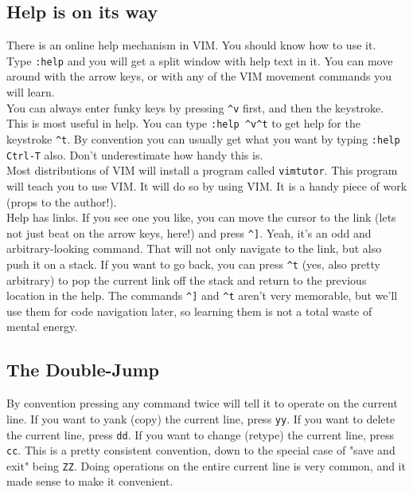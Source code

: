 \documentclass[a4paper, 12pt]{article}
\begin{document}
\subsection{Help is on its way}
\label{"Help is on its way"}
There is an online help mechanism in VIM. You should know how to use it.\\
Type \texttt{:help} and you will get a split window with help text in it. You can move around with the arrow keys, or with any of the VIM movement commands you will learn.\\
You can always enter funky keys by pressing \texttt{\^{}v} first, and then the keystroke. This is most useful in help. You can type \texttt{:help \^{}v\^{}t} to get help for the keystroke \texttt{\^{}t}. By convention you can usually get what you want by typing \texttt{:help Ctrl-T} also. Don't underestimate how handy this is.\\
Most distributions of VIM will install a program called \texttt{vimtutor}. This program will teach you to use VIM. It will do so by using VIM. It is a handy piece of work (props to the author!).\\
Help has links. If you see one you like, you can move the cursor to the link (lets not just beat on the arrow keys, here!) and press {\tt \^{}]}. Yeah, it's an odd and arbitrary-looking command. That will not only navigate to the link, but also push it on a stack. If you want to go back, you can press \texttt{\^{}t} (yes, also pretty arbitrary) to pop the current link off the stack and return to the previous location in the help. The commands \texttt{\^{}]} and \texttt{\^{}t} aren't very memorable, but we'll use them for code navigation later, so learning them is not a total waste of mental energy.
\subsection{The Double-Jump}
\label{"The Double-Jump"}
By convention pressing any command twice will tell it to operate on the current line. If you want to yank (copy) the current line, press \texttt{yy}. If you want to delete the current line, press \texttt{dd}. If you want to change (retype) the current line, press \texttt{cc}. This is a pretty consistent convention, down to the special case of "save and exit" being \texttt{ZZ}. Doing operations on the entire current line is very common, and it made sense to make it convenient.
\end{document}
